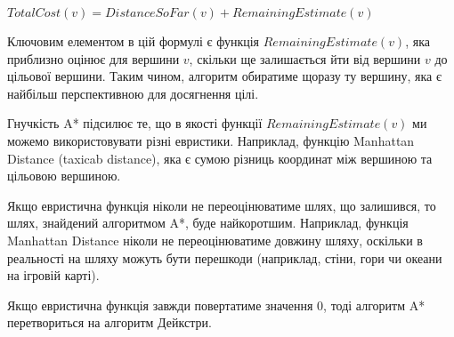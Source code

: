 \documentclass[12pt,a4paper]{report}
\begin{document}
\(TotalCost(v) = DistanceSoFar(v) + RemainingEstimate(v)\)

Ключовим елементом в цій формулі є функція \(RemainingEstimate(v)\), яка приблизно оцінює для вершини \(v\), скільки ще залишається йти від вершини \(v\) до цільової вершини. Таким чином, алгоритм обиратиме щоразу ту вершину, яка є найбільш перспективною для досягнення цілі.

Гнучкість A* підсилює те, що в якості функції \(RemainingEstimate(v)\) ми можемо використовувати різні евристики. Наприклад, функцію Manhattan Distance (taxicab distance), яка є сумою різниць координат між вершиною та цільовою вершиною.

Якщо евристична функція ніколи не переоцінюватиме шлях, що залишився, то шлях, знайдений алгоритмом A*, буде найкоротшим. Наприклад, функція Manhattan Distance ніколи не переоцінюватиме довжину шляху, оскільки в реальності на шляху можуть бути перешкоди (наприклад, стіни, гори чи океани на ігровій карті).

Якщо евристична функція завжди повертатиме значення 0, тоді алгоритм A* перетвориться на алгоритм Дейкстри.
\end{document}
